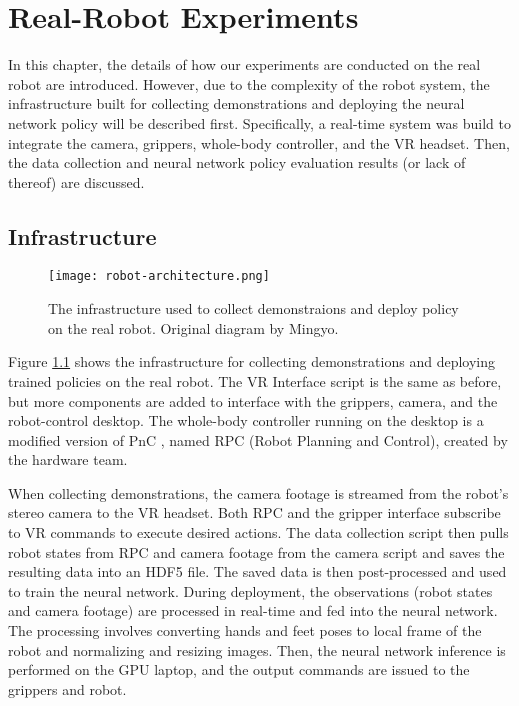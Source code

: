 \chapter{Real-Robot Experiments}

In this chapter, the details of how our experiments are conducted on the real robot are introduced. 
However, due to the complexity of the robot system, the infrastructure built for collecting demonstrations and deploying the neural network policy will be described first. Specifically, a real-time system was build to integrate the camera, grippers, whole-body controller, and the VR headset. Then, the data collection and neural network policy evaluation results (or lack of thereof) are discussed. 

\section{Infrastructure}

\begin{figure}
	\centering
	\texttt{[image: robot-architecture.png]}
    \caption{The infrastructure used to collect demonstraions and deploy policy on the real robot. Original diagram by Mingyo.}
    \label{fig:robot-architecture}
\end{figure}

Figure \ref{fig:robot-architecture} shows the infrastructure for collecting demonstrations and deploying trained policies on the real robot. 
The VR Interface script is the same as before, but more components are added to interface with the grippers, camera, and the robot-control desktop. The whole-body controller running on the desktop is a modified version of PnC \cite{Ahn2021VersatileLP}, named RPC (Robot Planning and Control), created by the hardware team. 

When collecting demonstrations, the camera footage is streamed from the robot's stereo camera to the VR headset. Both RPC and the gripper interface subscribe to VR commands to execute desired actions. The data collection script then pulls robot states from RPC and camera footage from the camera script and saves the resulting data into an HDF5 file. The saved data is then post-processed and used to train the neural network. 
During deployment, the observations (robot states and camera footage) are processed in real-time and fed into the neural network. The processing involves converting hands and feet poses to local frame of the robot and normalizing and resizing images. Then, the neural network inference is performed on the GPU laptop, and the output commands are issued to the grippers and robot. 

